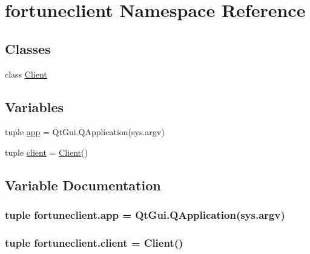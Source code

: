 \hypertarget{namespacefortuneclient}{}\section{fortuneclient Namespace Reference}
\label{namespacefortuneclient}
\subsection*{Classes}
\begin{DoxyCompactItemize}
\item 
class \hyperlink{classfortuneclient_1_1Client}{Client}
\end{DoxyCompactItemize}
\subsection*{Variables}
\begin{DoxyCompactItemize}
\item 
tuple \hyperlink{namespacefortuneclient_a835b5606cf4cbc4ee58ab8e09f20e0cb}{app} = Qt\+Gui.\+Q\+Application(sys.\+argv)
\item 
tuple \hyperlink{namespacefortuneclient_ae6d3f1817b63822e34031f552df09917}{client} = \hyperlink{classfortuneclient_1_1Client}{Client}()
\end{DoxyCompactItemize}


\subsection{Variable Documentation}
\hypertarget{namespacefortuneclient_a835b5606cf4cbc4ee58ab8e09f20e0cb}{}
\subsubsection[{app}]{\setlength{\rightskip}{0pt plus 5cm}tuple fortuneclient.\+app = Qt\+Gui.\+Q\+Application(sys.\+argv)}\label{namespacefortuneclient_a835b5606cf4cbc4ee58ab8e09f20e0cb}
\hypertarget{namespacefortuneclient_ae6d3f1817b63822e34031f552df09917}{}
\subsubsection[{client}]{\setlength{\rightskip}{0pt plus 5cm}tuple fortuneclient.\+client = {\bf Client}()}\label{namespacefortuneclient_ae6d3f1817b63822e34031f552df09917}
